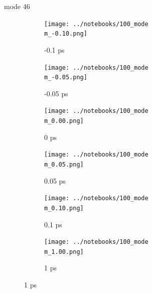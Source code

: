 \documentclass{beamer}
\begin{document}
\renewcommand\m{46}
\begin{frame}{mode \m}
	\begin{figure}
		\centering
		\begin{subfigure}[b]{\w\textwidth}
			\centering
			\texttt{[image: ../notebooks/100\_mode\\m\_-0.10.png]}
			\caption{-0.1 ps}
		\end{subfigure}
		\begin{subfigure}[b]{\w\textwidth}
			\centering
			\texttt{[image: ../notebooks/100\_mode\\m\_-0.05.png]}
			\caption{-0.05 ps}
		\end{subfigure}
		\begin{subfigure}[b]{\w\textwidth}
			\centering
			\texttt{[image: ../notebooks/100\_mode\\m\_0.00.png]}
			\caption{0 ps}
		\end{subfigure}
		\begin{subfigure}[b]{\w\textwidth}
			\centering
			\texttt{[image: ../notebooks/100\_mode\\m\_0.05.png]}
			\caption{0.05 ps}
		\end{subfigure}
		\begin{subfigure}[b]{\w\textwidth}
			\centering
			\texttt{[image: ../notebooks/100\_mode\\m\_0.10.png]}
			\caption{0.1 ps}
		\end{subfigure}
		\begin{subfigure}[b]{\w\textwidth}
			\centering
			\texttt{[image: ../notebooks/100\_mode\\m\_1.00.png]}
			\caption{1 ps}
		\end{subfigure}
	\end{figure}
\end{frame}
\end{document}
